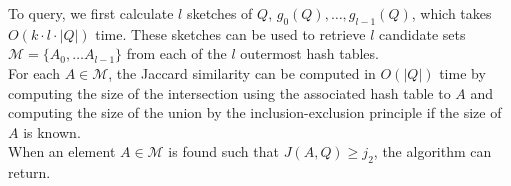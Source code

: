 To query, we first calculate $l$ sketches of $Q$, $g_0(Q), \dots, g_{l-1}(Q)$, which takes $O(k \cdot l \cdot |Q|)$ time. These sketches can be used to retrieve $l$ candidate sets $\mathcal{M} = \{ A_0, \dots A_{l-1}\}$ from each of the $l$ outermost hash tables. \\
For each $A\in \mathcal{M}$, the Jaccard similarity can be computed in $O(|Q|)$ time by computing the size of the intersection using the associated hash table to $A$ and computing the size of the union by the inclusion-exclusion principle if the size of $A$ is known.\\
When an element $A\in \mathcal{M}$ is found such that $J(A,Q) \geq j_2$, the algorithm can return.\\




